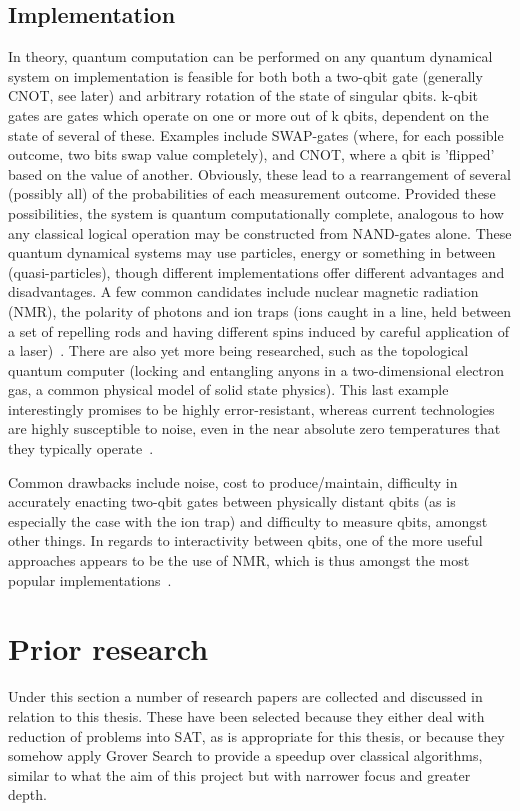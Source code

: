 \documentclass[msc,lith,english]{liuthesis}
\begin{document}
\subsection{Implementation}
In theory, quantum computation can be performed on any quantum dynamical system on implementation is feasible for both both a two-qbit gate (generally CNOT, see later) and arbitrary rotation of the state of singular qbits. k-qbit gates are gates which operate on one or more out of k qbits, dependent on the state of several of these. Examples include SWAP-gates (where, for each possible outcome, two bits swap value completely), and CNOT, where a qbit is 'flipped' based on the value of another. Obviously, these lead to a rearrangement of several (possibly all) of the probabilities of each measurement outcome\cite{QCQI}. Provided these possibilities, the system is quantum computationally complete, analogous to how any classical logical operation may be constructed from NAND-gates alone. These quantum dynamical systems may use particles, energy or something in between (quasi-particles), though different implementations offer different advantages and disadvantages. A few common candidates include nuclear magnetic radiation (NMR), the polarity of photons and ion traps (ions caught in a line, held between a set of repelling rods and having different spins induced by careful application of a laser)~\cite{QCQI}\cite{EIQC}. There are also yet more being researched, such as the topological quantum computer (locking and entangling anyons in a two-dimensional electron gas, a common physical model of solid state physics). This last example interestingly promises to be highly error-resistant, whereas current technologies are highly susceptible to noise, even in the near absolute zero temperatures that they typically operate~\cite{EIQC}. 

Common drawbacks include noise, cost to produce/maintain, difficulty in accurately enacting two-qbit gates between physically distant qbits (as is especially the case with the ion trap) and difficulty to measure qbits, amongst other things. In regards to interactivity between qbits, one of the more useful approaches appears to be the use of NMR, which is thus amongst the most popular implementations~\cite{QCQI}.

\section{Prior research}
Under this section a number of research papers are collected and discussed in relation to this thesis. These have been selected because they either deal with reduction of problems into SAT, as is appropriate for this thesis, or because they somehow apply Grover Search to provide a speedup over classical algorithms, similar to what the aim of this project but with narrower focus and greater depth.
\end{document}

